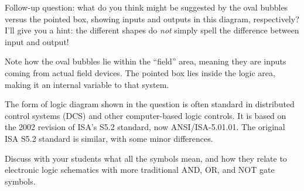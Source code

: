 \vskip 10pt

Follow-up question: what do you think might be suggested by the oval bubbles versus the pointed box, showing inputs and outputs in this diagram, respectively?  I'll give you a hint: the different shapes do {\it not} simply spell the difference between input and output!







Note how the oval bubbles lie within the ``field'' area, meaning they are inputs coming from actual field devices.  The pointed box lies inside the logic area, making it an internal variable to that system.

\vskip 10pt

The form of logic diagram shown in the question is often standard in distributed control systems (DCS) and other computer-based logic controls.  It is based on the 2002 revision of ISA's S5.2 standard, now ANSI/ISA-5.01.01.  The original ISA S5.2 standard is similar, with some minor differences.  

Discuss with your students what all the symbols mean, and how they relate to electronic logic schematics with more traditional AND, OR, and NOT gate symbols.




